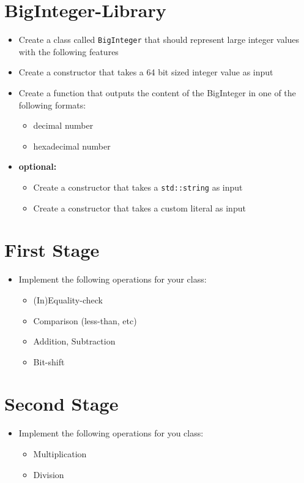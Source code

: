 \documentclass[12pt, a4paper]{article}
\begin{document}
\section*{BigInteger-Library}
\begin{itemize}
    \item Create a class called \lstinline{BigInteger} that should represent large integer values with the following features
    \item Create a constructor that takes a 64 bit sized integer value as input
    \item Create a function that outputs the content of the BigInteger in one of the following formats:
    \begin{itemize}
        \item decimal number
        \item hexadecimal number
    \end{itemize}
    \item \textbf{optional:}
    \begin{itemize}
        \item Create a constructor that takes a \lstinline{std::string} as input
        \item Create a constructor that takes a custom literal as input
    \end{itemize}
\end{itemize}
\section*{First Stage}
\begin{itemize}
    \item Implement the following operations for your class:
    \begin{itemize}
        \item (In)Equality-check
        \item Comparison (less-than, etc)
        \item Addition, Subtraction
        \item Bit-shift
    \end{itemize}
\end{itemize}
\section*{Second Stage}
\begin{itemize}
    \item Implement the following operations for you class:
    \begin{itemize}
        \item Multiplication
        \item Division
    \end{itemize}
\end{itemize}
\end{document}
